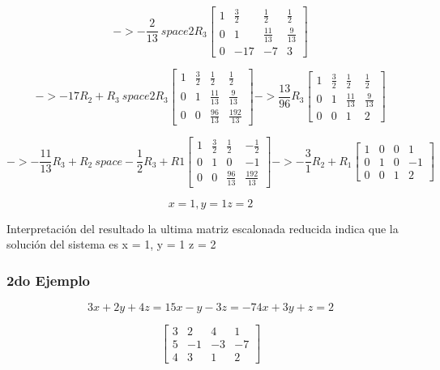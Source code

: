 \documentclass{article}
\begin{document}
\[
    -> -\frac{2}{13} \ space 2R_3
    \begin{bmatrix}1 & \frac{3}{2} & \frac{1}{2} & \frac{1}{2} \\ 0  & 1 & \frac{11}{13} & \frac{9}{13} \\ 0  & -17 & -7  & 3 \end{bmatrix}
\]

\[
    -> -17R_2 + R_3 \ space 2R_3
    \begin{bmatrix}1 & \frac{3}{2} & \frac{1}{2} & \frac{1}{2} \\ 0  & 1 & \frac{11}{13} & \frac{9}{13} \\ 0  & 0 & \frac{96}{13}  & \frac{192}{13} \end{bmatrix}
    -> \frac{13}{96}R_3
    \begin{bmatrix}1 & \frac{3}{2} & \frac{1}{2} & \frac{1}{2} \\ 0  & 1 & \frac{11}{13} & \frac{9}{13} \\ 0  & 0 & 1  & 2 \end{bmatrix}
\]

\[
    -> -\frac{11}{13} R_3 + R_2 \ space -\frac{1}{2}R_3+R1
    \begin{bmatrix}1 & \frac{3}{2} & \frac{1}{2} & -\frac{1}{2} \\ 0  & 1 & 0 & -1 \\ 0  & 0 & \frac{96}{13}  & \frac{192}{13} \end{bmatrix}
    -> -\frac{3}{1}R_2 +R_1
    \begin{bmatrix}1 & 0 & 0 & 1 \\ 0  & 1 & 0 & -1 \\ 0  & 0 & 1  & 2 \end{bmatrix}
    \]

\[
    x = 1, y = 1 z = 2
\]

Interpretación del resultado
la ultima matriz escalonada reducida indica que la solución del sistema es
x = 1, y = 1 z = 2


\subsubsection{2do Ejemplo}

\[
    3x +2y +4z = 1
    5x-y-3z = -7
    4x +3y + z = 2
\]

\[
    \begin{bmatrix}3 & 2 & 4 & 1 \\ 5  & -1 & -3 & -7 \\ 4  & 3 & 1  & 2 \end{bmatrix}
\]
\end{document}
